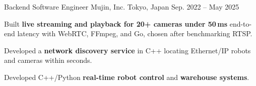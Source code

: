 \begin{cventries}
    \vspace{2mm}

  \cventry
      {Backend Software Engineer} %
    {Mujin, Inc.} %
      {Tokyo, Japan} %
    {Sep. 2022 -- May 2025} %
    {
      \begin{cvitems} %
        \item {Built \textbf{live streaming and playback for 20+ cameras under 50\,ms} end-to-end latency with WebRTC, FFmpeg, and Go, chosen after benchmarking RTSP.}
        \item {Developed a \textbf{network discovery service} in C++ locating Ethernet/IP robots and cameras within seconds.}
        \item {Developed C++/Python \textbf{real-time robot control} and \textbf{warehouse systems}.}
      \end{cvitems}
    }

    \vspace{2mm}


\end{cventries}

